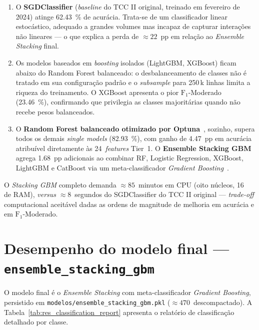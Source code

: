 \begin{enumerate}
  \item O \textbf{SGDClassifier} (\emph{baseline} do TCC II original, treinado em fevereiro de 2024) atinge \SI{62,43}{\percent} de acurácia. Trata-se de um classificador linear estocástico, adequado a grandes volumes mas incapaz de capturar interações não lineares --- o que explica a perda de \(\approx 22\)~pp em relação ao \emph{Ensemble Stacking} final.

  \item Os modelos baseados em \emph{boosting} isolados (LightGBM, XGBoost) ficam abaixo do Random Forest balanceado: o desbalanceamento de classes não é tratado em sua configuração padrão e o \emph{subsample} para 250\,k linhas limita a riqueza do treinamento. O XGBoost apresenta o pior \(\text{F}_1\)-Moderado (\SI{23,46}{\percent}), confirmando que privilegia as classes majoritárias quando não recebe pesos balanceados.

  \item O \textbf{Random Forest balanceado otimizado por Optuna}~\cite{akiba2019optuna}, sozinho, supera todos os demais \emph{single models} (\SI{82,93}{\percent}), com ganho de \SI{4,47}{pp} em acurácia atribuível diretamente às 24~\emph{features} Tier~1. O \textbf{Ensemble Stacking GBM} agrega \SI{1,68}{pp} adicionais ao combinar RF, Logistic Regression, XGBoost, LightGBM e CatBoost via um meta-classificador \emph{Gradient Boosting}~\cite{friedman2001greedy,wolpert1992stacked,chen2016xgboost,ke2017lightgbm,prokhorenkova2018catboost}.
\end{enumerate}

O \emph{Stacking GBM} completo demanda \(\approx 85\)~minutos em CPU (oito núcleos, \SI{16}{\giga\byte} de RAM), \emph{versus} \(\approx 8\)~segundos do SGDClassifier do TCC II original --- \emph{trade-off} computacional aceitável dadas as ordens de magnitude de melhoria em acurácia e em \(\text{F}_1\)-Moderado.

\section{Desempenho do modelo final --- \texttt{ensemble\_stacking\_gbm}}
\label{sec:res_modelo_final}

O modelo final é o \emph{Ensemble Stacking} com meta-classificador \emph{Gradient Boosting}, persistido em \texttt{modelos/ensemble\_stacking\_gbm.pkl} (\(\approx\num{470}\)\, descompactado). A Tabela~\ref{tab:res_classification_report} apresenta o relatório de classificação detalhado por classe.

